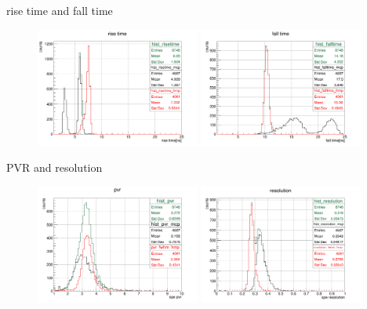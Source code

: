 \documentclass[11pt,compress,xcolor=x11names,UTF8]{beamer}
\begin{document}
\begin{frame}{rise time and fall time}
\begin{figure}
\centering
\includegraphics[width=0.48\textwidth]{risetime}
\includegraphics[width=0.48\textwidth]{falltime}
\end{figure}
\end{frame}
\begin{frame}{PVR and resolution}
\begin{figure}
\centering
\includegraphics[width=0.48\textwidth]{pvr}
\includegraphics[width=0.48\textwidth]{resolution}
\end{figure}
\end{frame}
\end{document}
